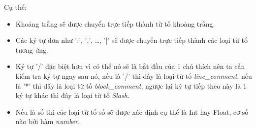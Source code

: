 Cụ thể:
\begin{itemize}
  \item Khoảng trắng sẽ được chuyển trực tiếp thành từ tố khoảng trắng.
  \item Các ký tự đơn như ':', ',', \dots , '|' sẽ được chuyển trực tiếp thành các loại từ tố tương ứng.
  \item Ký tự '/' đặc biệt hơn vì có thể nó sẽ là bắt đầu của 1 chú thích nên ta cần kiểm tra ký tự ngay sau nó, nếu là '/' thì đây là loại từ tố \textit{line\_comment}, nếu là '*' thì đây là loại từ tố \textit{block\_comment}, ngược lại ký tự tiếp theo này là 1 ký tự khác thì đây là loại từ tố \textit{Slash}.
  \item Nếu là số thì các loại từ tố số sẽ được xác định cụ thể là Int hay Float, cơ số nào bởi hàm \textit{number}.




\end{itemize}
